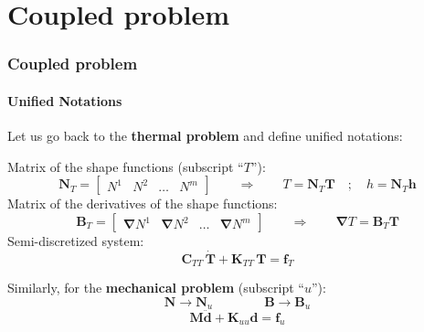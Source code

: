 \documentclass[10pt,xcolor=pdftex,dvipsnames,table]{beamer}
\begin{document}
\section{ Coupled problem  }

\begin{frame}
	\frametitle{ Coupled problem }
	\framesubtitle{ Unified Notations  }
	
	Let us go back to the \textbf{thermal problem} and define unified notations:
	
	\bigskip
	
	Matrix of the shape functions (subscript ``$T$''):
	\begin{equation*}
		\mathbf{N}_T =
		\begin{bmatrix}
			N^1 & N^2 & \dots & N^m
		\end{bmatrix}	 
		\qquad\Rightarrow\qquad T = \mathbf{N}_T \boldsymbol{T}\quad;\quad h = \mathbf{N}_T \boldsymbol{h}
	\end{equation*}	
	Matrix of the derivatives of the shape functions:
	\begin{equation*}
		\mathbf{B}_T =
		\begin{bmatrix}
			\boldsymbol{\nabla}N^1 & \boldsymbol{\nabla}N^2 & \dots & \boldsymbol{\nabla}N^m
		\end{bmatrix}	 
		\qquad\Rightarrow\qquad \boldsymbol{\nabla}T = \mathbf{B}_T \boldsymbol{T}
	\end{equation*}	
	Semi-discretized system:
	\begin{equation*}
		\mathbf{C}_{TT}\, \dot{\boldsymbol{T}} + \mathbf{K}_{TT}\, \boldsymbol{T} = \boldsymbol{f}_T
	\end{equation*}
	
	
	Similarly, for the \textbf{mechanical problem} (subscript ``$u$''):
	\begin{equation*}
		\mathbf{N} \rightarrow \mathbf{N}_u	 
		\qquad\qquad \mathbf{B} \rightarrow \mathbf{B}_u	
	\end{equation*}		
	\begin{equation*}
		\mathbf{M}\ddot{\boldsymbol{d}}+\mathbf{K}_{uu}\boldsymbol{d}=\boldsymbol{f}_u
	\end{equation*}		
\end{frame}
\end{document}
